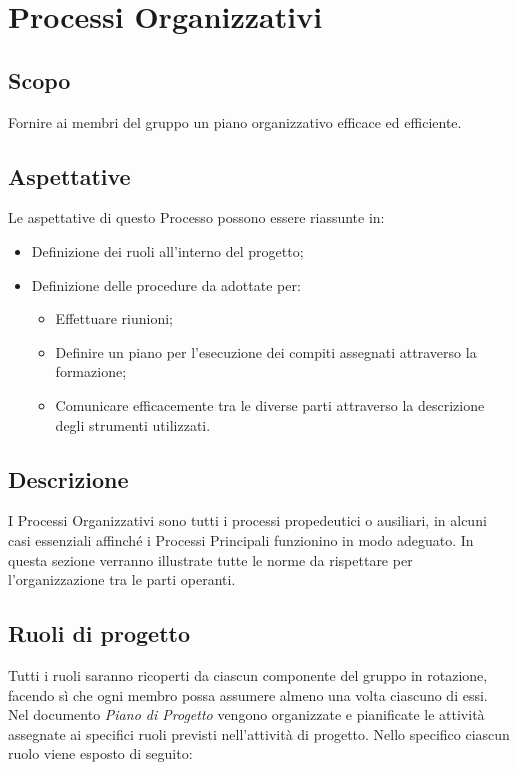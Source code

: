 \section{Processi Organizzativi}
\subsection{Scopo}
	 Fornire ai membri del gruppo un piano organizzativo efficace ed efficiente.
	 
	 
\subsection{Aspettative}
	Le aspettative di questo Processo possono essere riassunte in:
	\begin{itemize}
		\item Definizione dei ruoli all'interno del progetto;
		\item Definizione delle procedure da adottate per:
		\begin{itemize}
			\item Effettuare riunioni;
			\item Definire un piano per l'esecuzione dei compiti assegnati attraverso la formazione;
			\item Comunicare efficacemente tra le diverse parti attraverso la descrizione degli strumenti utilizzati.
		\end{itemize}
	\end{itemize}

	
\subsection{Descrizione}
	I Processi Organizzativi sono tutti i processi propedeutici o ausiliari, in alcuni casi essenziali affinché i Processi Principali funzionino in modo adeguato. In questa sezione verranno illustrate tutte le norme da rispettare per l'organizzazione tra le parti operanti.
	



\subsection{Ruoli di progetto}
	Tutti i ruoli saranno ricoperti da ciascun componente del gruppo in rotazione, facendo sì che ogni membro possa assumere almeno una volta ciascuno di essi. Nel documento {\it Piano di Progetto} vengono organizzate e pianificate le attività assegnate ai specifici ruoli previsti nell’attività di progetto. Nello specifico ciascun ruolo viene esposto di seguito:
	
